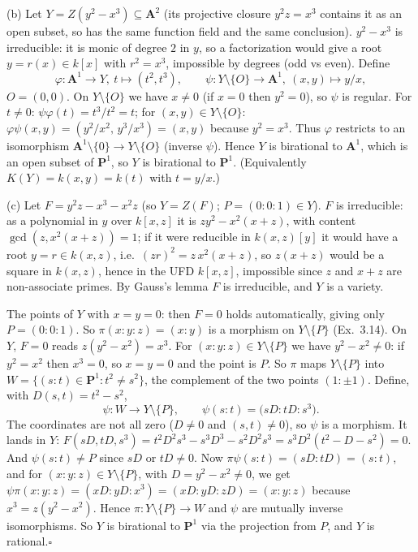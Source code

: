 \documentclass[11pt]{article}
\begin{document}
(b) Let $Y=Z(y^2-x^3)\subseteq\mathbf A^2$ (its projective closure $y^2z=x^3$ contains it as an open subset, so has the same function field and the same conclusion). $y^2-x^3$ is irreducible: it is monic of degree $2$ in $y$, so a factorization would give a root $y=r(x)\in k[x]$ with $r^2=x^3$, impossible by degrees (odd vs even). Define
\[
\varphi:\mathbf A^1\to Y,\ t\mapsto(t^2,t^3),\qquad \psi:Y\setminus\{O\}\to\mathbf A^1,\ (x,y)\mapsto y/x,
\]
$O=(0,0)$. On $Y\setminus\{O\}$ we have $x\ne0$ (if $x=0$ then $y^2=0$), so $\psi$ is regular. For $t\neq0$: $\psi\varphi(t)=t^3/t^2=t$; for $(x,y)\in Y\setminus\{O\}$: $\varphi\psi(x,y)=(y^2/x^2,\,y^3/x^3)=(x,y)$ because $y^2=x^3$. Thus $\varphi$ restricts to an isomorphism $\mathbf A^1\setminus\{0\}\to Y\setminus\{O\}$ (inverse $\psi$). Hence $Y$ is birational to $\mathbf A^1$, which is an open subset of $\mathbf P^1$, so $Y$ is birational to $\mathbf P^1$. (Equivalently $K(Y)=k(x,y)=k(t)$ with $t=y/x$.)

(c) Let $F=y^2z-x^3-x^2z$ (so $Y=Z(F)$; $P=(0:0:1)\in Y$). $F$ is irreducible: as a polynomial in $y$ over $k[x,z]$ it is $zy^2-x^2(x+z)$, with content $\gcd(z,x^2(x+z))=1$; if it were reducible in $k(x,z)[y]$ it would have a root $y=r\in k(x,z)$, i.e.\ $(zr)^2=z\,x^2(x+z)$, so $z(x+z)$ would be a square in $k(x,z)$, hence in the UFD $k[x,z]$, impossible since $z$ and $x+z$ are non-associate primes. By Gauss's lemma $F$ is irreducible, and $Y$ is a variety.

The points of $Y$ with $x=y=0$: then $F=0$ holds automatically, giving only $P=(0:0:1)$. So $\pi(x:y:z)=(x:y)$ is a morphism on $Y\setminus\{P\}$ (Ex.~3.14). On $Y$, $F=0$ reads $z(y^2-x^2)=x^3$. For $(x:y:z)\in Y\setminus\{P\}$ we have $y^2-x^2\ne0$: if $y^2=x^2$ then $x^3=0$, so $x=y=0$ and the point is $P$. So $\pi$ maps $Y\setminus\{P\}$ into $W=\{(s:t)\in\mathbf P^1:t^2\ne s^2\}$, the complement of the two points $(1:\pm1)$. Define, with $D(s,t)=t^2-s^2$,
\[
\psi:W\to Y\setminus\{P\},\qquad \psi(s:t)=\bigl(sD:tD:s^3\bigr).
\]
The coordinates are not all zero ($D\ne0$ and $(s,t)\ne0$), so $\psi$ is a morphism. It lands in $Y$: $F(sD,tD,s^3)=t^2D^2s^3-s^3D^3-s^2D^2s^3=s^3D^2(t^2-D-s^2)=0$. And $\psi(s:t)\neq P$ since $sD$ or $tD\ne0$. Now $\pi\psi(s:t)=(sD:tD)=(s:t)$, and for $(x:y:z)\in Y\setminus\{P\}$, with $D=y^2-x^2\ne0$, we get $\psi\pi(x:y:z)=(xD:yD:x^3)=(xD:yD:zD)=(x:y:z)$ because $x^3=z(y^2-x^2)$. Hence $\pi:Y\setminus\{P\}\to W$ and $\psi$ are mutually inverse isomorphisms. So $Y$ is birational to $\mathbf P^1$ via the projection from $P$, and $Y$ is rational.\hfill$\square$
\end{document}
